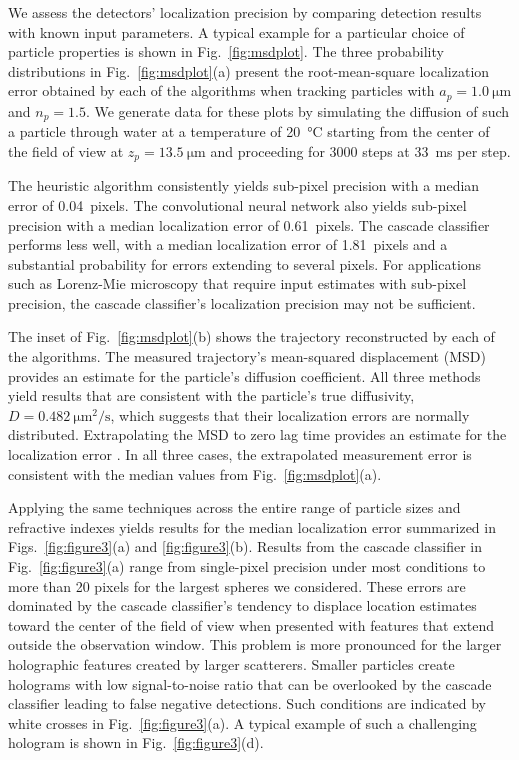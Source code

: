 We assess the detectors' localization precision by 
comparing detection results with known 
input parameters.
A typical example for a particular choice of particle
properties is shown in Fig.~\ref{fig:msdplot}.
The three probability distributions 
in Fig.~\ref{fig:msdplot}(a) present
the root-mean-square localization error
obtained by each of the algorithms when tracking
particles with
$a_p =\SI{1.0}{\um}$ and $n_p = \num{1.5}$.
We generate data for these plots by simulating the
diffusion of such a particle through water
at a temperature of \SI{20}{\celsius} starting from 
the center of the field of view at $z_p=\SI{13.5}{\um}$
and proceeding for \num{3000} steps at \SI{33}{\ms} per step.

The heuristic algorithm consistently 
yields sub-pixel precision with a median error of 
\SI{0.04}{pixels}. 
The convolutional neural network also yields sub-pixel
precision with a median localization error of \SI{0.61}{pixels}.
The cascade classifier performs less well,
with a median localization error of \SI{1.81}{pixels} and
a substantial probability
for errors extending to several pixels.
For applications such as Lorenz-Mie microscopy
that require input estimates with sub-pixel precision,
the cascade classifier's localization precision may not
be sufficient.

The inset of Fig.~\ref{fig:msdplot}(b) shows the trajectory
reconstructed by each of the algorithms.
The measured trajectory's mean-squared displacement (MSD)
provides an estimate for the particle's
diffusion coefficient.
All three methods yield results that are consistent with
the particle's true diffusivity,
$D = \SI{0.482}{\um^2 \per \second}$,
which suggests that
their localization errors are normally distributed.
Extrapolating the MSD to zero lag time 
provides an estimate for the localization error \cite{crocker96,michalet12}.
In all three cases, the extrapolated measurement error
is consistent with the median values from Fig.~\ref{fig:msdplot}(a). 

Applying the same techniques across the entire range of particle
sizes and refractive indexes yields results for the median
localization error summarized in
Figs.~\ref{fig:figure3}(a) and \ref{fig:figure3}(b).
Results from the cascade classifier in Fig.~\ref{fig:figure3}(a)
range from single-pixel precision under most conditions to 
more than 20 pixels for the largest spheres we considered.
These errors are dominated by the cascade classifier's tendency
to displace location estimates toward the center of the
field of view when presented with features that extend outside
the observation window.
This problem is more pronounced
for the larger holographic features created by larger scatterers.
Smaller particles create holograms with low signal-to-noise 
ratio that can be overlooked by the cascade classifier leading
to false negative detections.
Such conditions are indicated by white crosses in
Fig.~\ref{fig:figure3}(a).
A typical example of such a challenging hologram is
shown in Fig.~\ref{fig:figure3}(d).

